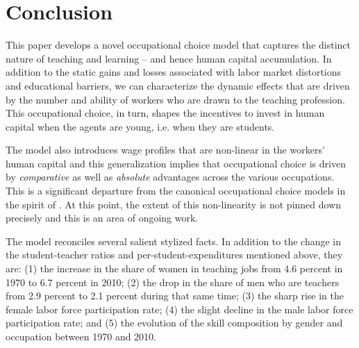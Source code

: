 \documentclass[onehalfspacing,11pt]{article}
\begin{document}


\newpage
\section{Conclusion}\label{sec:conclusion}
This paper develops a novel occupational choice model that captures the distinct nature of teaching and learning -- and hence human capital accumulation. In addition to the static gains and losses associated with labor market distortions and educational barriers, we can characterize the dynamic effects that are driven by the number and ability of workers who are drawn to the teaching profession. This occupational choice, in turn, shapes the incentives to invest in human capital when the agents are young, i.e. when they are students.

The model also introduces wage profiles that are non-linear in the workers' human capital and this generalization implies that occupational choice is driven by {\it comparative} as well as {\it absolute} advantages across the various occupations. This is a significant departure from the canonical occupational choice models in the spirit of \cite{Roy:1951}. At this point, the extent of this non-linearity is not pinned down precisely and this is an area of ongoing work.

The model reconciles several salient stylized facts. In addition to the change in the student-teacher ratios and per-student-expenditures mentioned above, they are: (1) the increase in the share of women in teaching jobs from 4.6 percent in 1970 to 6.7 percent in 2010; (2) the drop in the share of men who are teachers from 2.9 percent to 2.1 percent during that same time; (3) the sharp rise in the female labor force participation rate; (4) the slight decline in the male labor force participation rate; and (5) the evolution of the skill composition by gender and occupation between 1970 and 2010.
\end{document}
